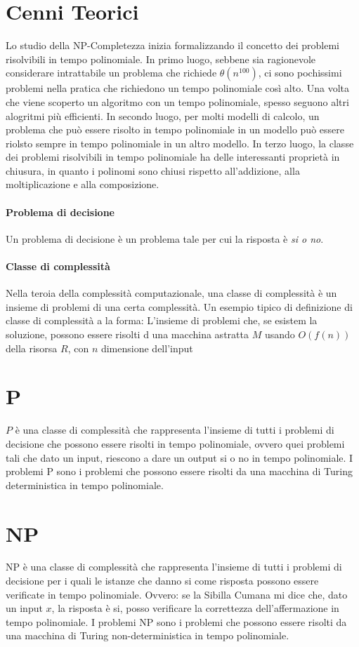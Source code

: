 \documentclass[12pt, a4paper, openany]{book}
\begin{document}
\section{Cenni Teorici}
Lo studio della NP-Completezza inizia formalizzando il concetto dei problemi risolvibili in tempo polinomiale.
In primo luogo, sebbene sia ragionevole considerare intrattabile un problema che richiede $\theta(n^{100})$, ci sono pochissimi problemi nella pratica che richiedono un tempo polinomiale così alto.
Una volta che viene scoperto un algoritmo con un tempo polinomiale, spesso seguono altri alogritmi più efficienti.
In secondo luogo, per molti modelli di calcolo, un problema che può essere risolto in tempo polinomiale in un modello può essere riolsto sempre in tempo polinomiale in un altro modello.
In terzo luogo, la classe dei problemi risolvibili in tempo polinomiale ha delle interessanti proprietà in chiusura, in quanto i polinomi sono chiusi rispetto all'addizione, alla moltiplicazione e alla composizione.

\paragraph*{Problema di decisione}
Un problema di decisione è un problema tale per cui la risposta è \emph{si o no}.
\paragraph*{Classe di complessità}
Nella teroia della complessità computazionale, una classe di complessità è un insieme di problemi di una certa complessità.
Un esempio tipico di definizione di classe di complessità a la forma:
L'insieme di problemi che, se esistem la soluzione, possono essere risolti d una macchina astratta $M$ usando $O(f(n))$ della risorsa $R$, con $n$ dimensione dell'input
\section{P}
$P$ è una classe di complessità che rappresenta l'insieme di tutti i problemi di decisione che possono essere risolti in tempo polinomiale, ovvero quei problemi tali che dato un input, riescono a dare un output si o no in tempo polinomiale.
I problemi P sono i problemi che possono essere risolti da una macchina di Turing deterministica in tempo polinomiale.
\section{NP}
NP è una classe di complessità che rappresenta l'insieme di tutti i problemi di decisione per i quali le istanze che danno si come risposta possono essere verificate in tempo polinomiale.
Ovvero: se la Sibilla Cumana mi dice che, dato un input $x$, la risposta è si, posso verificare la correttezza dell'affermazione in tempo polinomiale.
I problemi NP sono i problemi che possono essere risolti da una macchina di Turing non-deterministica in tempo polinomiale.
\end{document}
